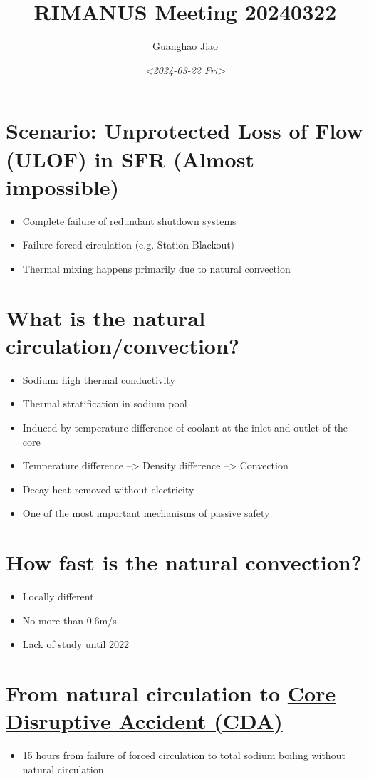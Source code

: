 \documentclass[11pt]{article}
\author{Guanghao Jiao}
\date{\textit{<2024-03-22 Fri>}}
\title{RIMANUS Meeting 20240322}
\begin{document}
\maketitle

\section{Scenario: Unprotected Loss of Flow (ULOF) in SFR (Almost impossible)}
\label{sec:org40b54c4}
\begin{itemize}
\item Complete failure of redundant shutdown systems
\item Failure forced circulation (e.g. Station Blackout)
\item Thermal mixing happens primarily due to natural convection
\end{itemize}

\section{What is the natural circulation/convection?}
\label{sec:orgf14a69d}
\begin{itemize}
\item Sodium: high thermal conductivity
\item Thermal stratification in sodium pool
\item Induced by temperature difference of coolant at the inlet and outlet of the core
\item Temperature difference --> Density difference --> Convection
\item Decay heat removed without electricity
\item One of the most important mechanisms of passive safety
\end{itemize}

\section{How fast is the natural convection?}
\label{sec:orgc34b094}
\begin{itemize}
\item Locally different
\item No more than 0.6m/s
\item Lack of study until 2022
\end{itemize}

\section{From natural circulation to \href{20240307154931-core_disruptive_accident_cda.org}{Core Disruptive Accident (CDA)}}
\label{sec:orgb3688b5}
\begin{itemize}
\item 15 hours from failure of forced circulation to total sodium boiling without natural circulation
\end{itemize}
\end{document}
